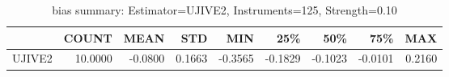 \begin{table}[ht]
\centering
\caption{bias summary: Estimator=UJIVE2, Instruments=125, Strength=0.10}
\begin{tabular}{lrrrrrrrr}
\toprule
 & COUNT & MEAN & STD & MIN & 25\% & 50\% & 75\% & MAX \\
\midrule
UJIVE2 & 10.0000 & -0.0800 & 0.1663 & -0.3565 & -0.1829 & -0.1023 & -0.0101 & 0.2160 \\
\bottomrule
\end{tabular}
\end{table}
